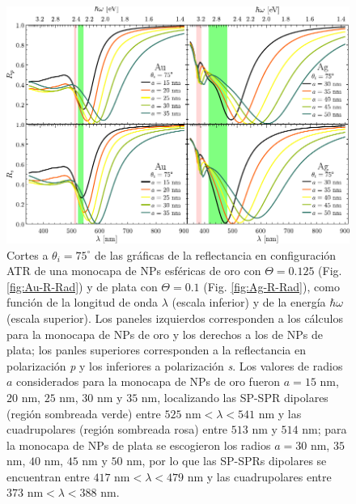 	\begin{figure}[h!]\centering
	\includegraphics[scale=1]{2-Resultados/figs/8-AurVar/0-cut75_Au_Aug.pdf}\vspace*{-.5em}
	\caption{Cortes a $\theta_i = 75^\circ$ de las gráficas de  la reflectancia  en configuración ATR  de una monocapa de NPs esféricas de oro con $\Theta=0.125$ (Fig. \ref{fig:Au-R-Rad}) y de plata con $\Theta=0.1$ (Fig. \ref{fig:Ag-R-Rad}), como función de la longitud de onda $\lambda$ (escala inferior) y de la energía $\hbar\omega$ (escala superior). Los paneles izquierdos corresponden a los cálculos para la monocapa de NPs de oro y los derechos a los de NPs de plata; los panles superiores corresponden a la reflectancia en polarización \emph{p} y los inferiores a polarización \emph{s}. Los valores de radios $a$ considerados para la monocapa de NPs de oro fueron  $a=15$ nm, $20$ nm, $25$ nm, $30$ nm y $35$ nm, localizando las SP-SPR dipolares (región sombreada verde) entre $525\mbox{ nm}<\lambda<541\mbox{ nm}$ y las cuadrupolares  (región sombreada rosa) entre $513$ nm y $514$ nm; para la monocapa de NPs de plata se escogieron los radios  $a=30$ nm, $35$ nm, $40$ nm, $45$ nm y $50$ nm, por lo que las SP-SPRs dipolares se encuentran entre $417\mbox{ nm}<\lambda<479\mbox{ nm}$ y las cuadrupolares entre $373\mbox{ nm}<\lambda<388\mbox{ nm}$.}\label{fig:AuAg-Cuts-Rad-75}
	\end{figure}	


